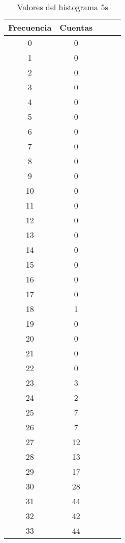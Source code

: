 \begin{center}
\begin{table}[H]
\caption{Valores del histograma 5s}
\label{Tab:histo_5s}
\begin{tabular}{ccccc}
\toprule
Frecuencia & Cuentas \\
\midrule
\num{    0} & \num{    0} \\
\num{    1} & \num{    0} \\
\num{    2} & \num{    0} \\
\num{    3} & \num{    0} \\
\num{    4} & \num{    0} \\
\num{    5} & \num{    0} \\
\num{    6} & \num{    0} \\
\num{    7} & \num{    0} \\
\num{    8} & \num{    0} \\
\num{    9} & \num{    0} \\
\num{   10} & \num{    0} \\
\num{   11} & \num{    0} \\
\num{   12} & \num{    0} \\
\num{   13} & \num{    0} \\
\num{   14} & \num{    0} \\
\num{   15} & \num{    0} \\
\num{   16} & \num{    0} \\
\num{   17} & \num{    0} \\
\num{   18} & \num{    1} \\
\num{   19} & \num{    0} \\
\num{   20} & \num{    0} \\
\num{   21} & \num{    0} \\
\num{   22} & \num{    0} \\
\num{   23} & \num{    3} \\
\num{   24} & \num{    2} \\
\num{   25} & \num{    7} \\
\num{   26} & \num{    7} \\
\num{   27} & \num{   12} \\
\num{   28} & \num{   13} \\
\num{   29} & \num{   17} \\
\num{   30} & \num{   28} \\
\num{   31} & \num{   44} \\
\num{   32} & \num{   42} \\
\num{   33} & \num{   44} \\

\end{tabular}
\end{table}
\end{center}
